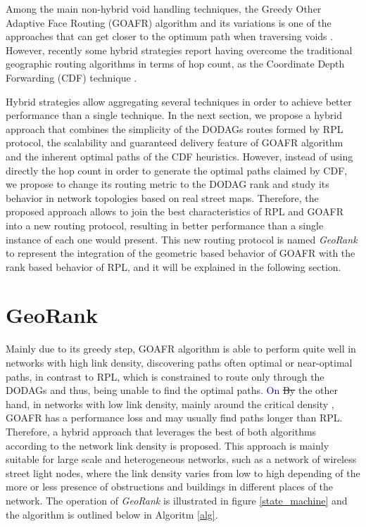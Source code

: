 \documentclass[authoryear,preprint,review,12pt]{elsarticle}
\newcommand{\rev}{\textcolor{blue}}
\begin{document}
Among the main non-hybrid void handling techniques, the Greedy Other Adaptive Face Routing (GOAFR) algorithm and its variations is one of the approaches that can get closer to the optimum path when traversing voids \citep{GOAFR_2008}. However, recently some hybrid strategies report having overcome the traditional geographic routing algorithms in terms of hop count, as the Coordinate Depth Forwarding (CDF) technique \citep{Denardin2011}.

Hybrid strategies allow aggregating several techniques in order to achieve better performance than a single technique. In the next section, we propose a hybrid approach that combines the simplicity of the DODAGs routes formed by RPL protocol, the scalability and guaranteed delivery feature of GOAFR algorithm and the inherent optimal paths of the CDF heuristics. However, instead of using directly the hop count in order to generate the optimal paths claimed by CDF, we propose to change its routing metric to the DODAG rank and study its behavior in network topologies based on real street maps. Therefore, the proposed approach allows to join the best characteristics of RPL and GOAFR into a new routing protocol, resulting in better performance than a single instance of each one would present. This new routing protocol is named \textit{GeoRank} to represent the integration of the geometric based behavior of GOAFR with the rank based behavior of RPL, and it will be explained in the following section.

\section{GeoRank}
\label{secGeoRank}

Mainly due to its greedy step, GOAFR algorithm is able to perform quite well in networks with high link density, discovering paths often optimal or near-optimal paths, in contrast to RPL, which is constrained to route only through the DODAGs and thus, being unable to find the optimal paths. \rev{On} \sout{By} the other hand, in networks with low link density, mainly around the critical density \citep{GOAFR_2008}, GOAFR has a performance loss and may usually find paths longer than RPL. Therefore, a hybrid approach that leverages the best of both algorithms according to the network link density is proposed. This approach is mainly suitable for large scale and heterogeneous networks, such as a network of wireless street light nodes, where the link density varies from low to high depending of the more or less presence of obstructions and buildings in different places of the network.  The operation of \textit{GeoRank} is illustrated in figure \ref{state_machine} and the algorithm is outlined below in Algoritm \ref{alg}.
\end{document}
